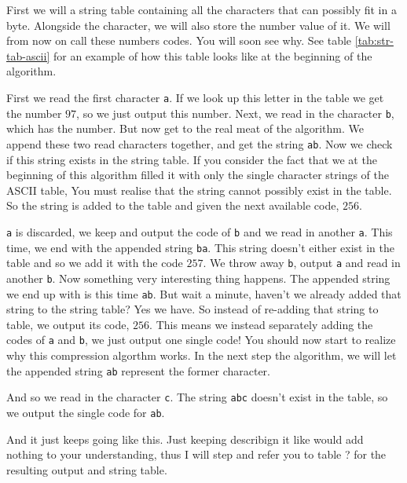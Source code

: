 \begin{refsection}
First we will a string table containing all the characters that can
possibly fit in a byte. Alongside the character, we will also store
the \ascii number value of it. We will from now on call these numbers
codes. You will soon see why. See table \ref{tab:str-tab-ascii} for an
example of how this table looks like at the beginning of the algorithm.

First we read the first character \texttt{a}. If we look up this
letter in the table we get the number $97$, so we just output this
number. Next, we read in the character \texttt{b}, which has the
number. But now get to the real meat of the algorithm. We append
these two read characters together, and get  the string
\texttt{ab}. Now we check if this string exists in the string
table. If you consider the fact that we at the beginning of this
algorithm filled it with only the single character strings of the
ASCII table, You must realise that the string cannot possibly exist
in the table. So the string is added to the table and given the next
available code, $256$.

\texttt{a} is discarded, we keep and output the code of \texttt{b} and
we read in another \texttt{a}. This time, we end with the appended
string \texttt{ba}. This string doesn't either exist in the table and
so we add it with the code $257$. We throw away \texttt{b}, output \texttt{a} and read in
another \texttt{b}. Now something very interesting thing happens. The
appended string we end up with is this time \texttt{ab}. But wait a
minute, haven't we already added that string to the string table? Yes
we have. So instead of re-adding that string to table, we output its
code, $256$. This means we instead separately adding the codes of \texttt{a} and
\texttt{b}, we just output one single code! You should now start to
realize why this compression algorthm works. In the next step the
algorithm, we will let the appended string \texttt{ab} represent the
former character.

And so we read in the character \texttt{c}. The string \texttt{abc}
doesn't exist in the table, so we output the single code for
\texttt{ab}.

And it just keeps going like this. Just keeping describign it like
would add nothing to your understanding, thus I will step and refer
you to table ? for the resulting output and string table.

\newcommand{\dotsrow}{\dots & \dots \\}
\newcommand{\strrow}[2]{$#1$ & #2 \\}


\end{refsection}
